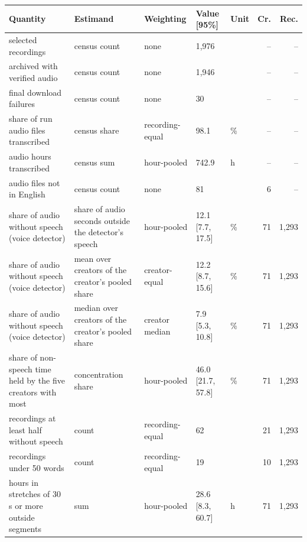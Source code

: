 {\scriptsize\setlength{\tabcolsep}{2pt}
\begin{tabular}{@{}p{}p{}p{}lp{}rr@{}}
\toprule
Quantity & Estimand & Weighting & Value [95\%] & Unit & Cr. & Rec. \\
\midrule
selected recordings & census count & none & 1{,}976 &  & -- & -- \\
archived with verified audio & census count & none & 1{,}946 &  & -- & -- \\
final download failures & census count & none & 30 &  & -- & -- \\
share of run audio files transcribed & census share & recording-equal & 98.1 & \% & -- & -- \\
audio hours transcribed & census sum & hour-pooled & 742.9 & h & -- & -- \\
audio files not in English & census count & none & 81 &  & 6 & -- \\
share of audio without speech (voice detector) & share of audio seconds outside the detector's speech & hour-pooled & 12.1 [7.7, 17.5] & \% & 71 & 1{,}293 \\
share of audio without speech (voice detector) & mean over creators of the creator's pooled share & creator-equal & 12.2 [8.7, 15.6] & \% & 71 & 1{,}293 \\
share of audio without speech (voice detector) & median over creators of the creator's pooled share & creator median & 7.9 [5.3, 10.8] & \% & 71 & 1{,}293 \\
share of non-speech time held by the five creators with most & concentration share & hour-pooled & 46.0 [21.7, 57.8] & \% & 71 & 1{,}293 \\
recordings at least half without speech & count & recording-equal & 62 &  & 21 & 1{,}293 \\
recordings under 50 words & count & recording-equal & 19 &  & 10 & 1{,}293 \\
hours in stretches of 30 s or more outside segments & sum & hour-pooled & 28.6 [8.3, 60.7] & h & 71 & 1{,}293 \\

\end{tabular}}
